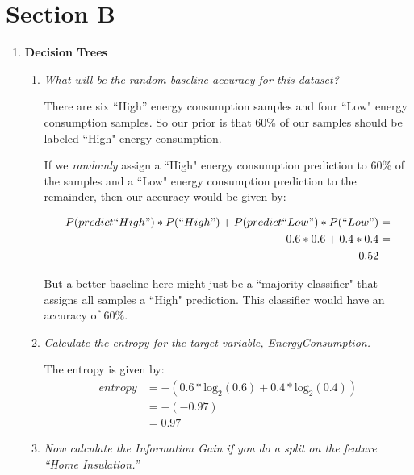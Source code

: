 \documentclass[11pt]{article}
\begin{document}
\section*{Section B}
\begin{enumerate}
    \item \textbf{Decision Trees}
        \begin{enumerate}
            \item \textit{What will be the random baseline accuracy for this
                dataset?}

                There are six ``High'' energy consumption samples and four
                ``Low" energy consumption samples. So our prior is that 60\% of
                our samples should be labeled ``High" energy consumption.

                If we \textit{randomly} assign a ``High" energy consumption
                prediction to 60\% of the samples and a ``Low" energy
                consumption prediction to the remainder, then our accuracy
                would be given by:

                \begin{align*}
                    P(predict ``High") * P(``High") + P(predict ``Low") * P(``Low")
                    &= \\
                    0.6 * 0.6 + 0.4 * 0.4 &= \\
                    0.52
                \end{align*}

                But a better baseline here might just be a ``majority
                classifier" that assigns all samples a ``High" prediction. This
                classifier would have an accuracy of 60\%.

            \item \textit{Calculate the entropy for the target variable,
                EnergyConsumption.}

                The entropy is given by:
                \begin{align*}
                    entropy & = - (0.6 * \text{log}_2(0.6) + 0.4 * \text{log}_2(0.4)) \\
                    & = -(-0.97) \\
                    & = 0.97
                \end{align*}

            \item \textit{Now calculate the Information Gain if you do a split
                on the feature ``Home Insulation.''}


\end{enumerate}
\end{enumerate}
\end{document}

